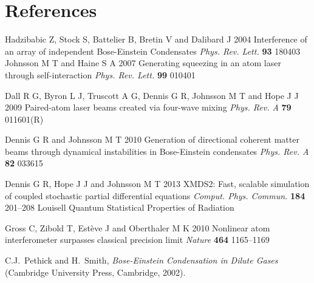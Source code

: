 \documentclass{iopart}
\begin{document}
\section*{References}
\begin{thebibliography}{10}
 Hadzibabic Z, Stock S, Battelier B, Bretin V and Dalibard J 2004 Interference of an array of independent Bose-Einstein Condensates {\it Phys. Rev. Lett.} {\bf 93} 180403
 Johnsson M T and Haine S A 2007 Generating squeezing in an atom laser through self-interaction {\it Phys. Rev. Lett.} {\bf 99} 010401

 Dall R G, Byron L J, Truscott A G, Dennis G R, Johnsson M T and Hope J J 2009 Paired-atom laser beams created via four-wave mixing {\it Phys. Rev. A} {\bf 79} 011601(R)

 Dennis G R and Johnsson M T 2010 Generation of directional coherent matter beams through dynamical instabilities in Bose-Einstein condensates {\it Phys. Rev. A} {\bf 82} 033615


 Dennis G R, Hope J J and Johnsson M T 2013 XMDS2: Fast, scalable simulation of coupled stochastic partial
differential equations {\it Comput. Phys. Commun.} {\bf 184} 201--208
 Louisell Quantum Statistical Properties of Radiation

 Gross C, Zibold T, Est{\`{e}}ve J and Oberthaler M K 2010 Nonlinear atom interferometer surpasses classical
precision limit {\it Nature} {\bf 464} 1165--1169

 C.J.~Pethick and H.~Smith, \emph{Bose-Einstein Condensation in Dilute Gases} (Cambridge University Press, Cambridge, 2002).

\end{thebibliography}
\end{document}
